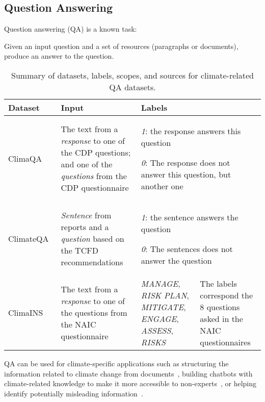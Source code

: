 \subsection{Question Answering}
\label{sec:qa}

Question answering (QA) is a known task:

\task Given an input question and a set of resources (paragraphs or documents), produce an answer to the question. 

\begin{table}[ht]
\centering
\begin{tabular}{p{2cm}p{5cm}p{3cm}p{4cm}}
\toprule
\textbf{Dataset} & \textbf{Input} & \textbf{Labels}                                                                                  &                                          \\
\midrule
ClimaQA ~\cite{spokoyny2023answering} 
& The text from a \textit{response} to one of the CDP questions; and one of the \textit{questions} from the CDP questionnaire  & \multicolumn{2}{p{7cm}}{\textit{1}: the response answers this question

\textit{0}: The response does not answer this question, but another one} \\
\midrule
ClimateQA~\cite{luccioni_analyzing_2020} & \textit{Sentence} from reports and a \textit{question} based on the TCFD recommendations & \multicolumn{2}{p{7cm}}{\textit{1}: the sentence answers the question

\textit{0}: The sentences does not answer the question} \\
\midrule
ClimaINS ~\cite{spokoyny2023answering} 
& The text from a \textit{response} to one of the questions from the NAIC questionnaire & \textit{MANAGE}, \textit{RISK PLAN}, \textit{MITIGATE}, \textit{ENGAGE}, \textit{ASSESS}, \textit{RISKS} & The labels correspond the 8 questions asked in the NAIC questionnaires \\
\bottomrule
\end{tabular}
\caption{Summary of datasets, labels, scopes, and sources for climate-related QA datasets.}
\label{tab:qa input}
\end{table}

QA can be used for climate-specific applications such as structuring the information related to climate change from documents~\cite{luccioni_analyzing_2020, tobias_schimanski_climatebert-netzero_2023}, building chatbots with climate-related knowledge to make it more accessible to non-experts~\cite{s_vaghefi_chatclimate_2023, cliamtebot_2022}, or helping identify potentially misleading information~\cite{jingwei_ni_paradigm_2023}. 

